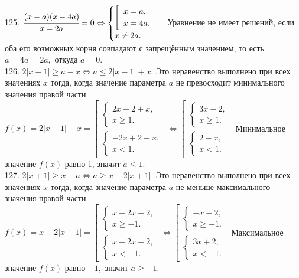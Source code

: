 \documentclass[12pt]{article}
\begin{document}
125. $\cfrac{(x-a)(x-4a)}{x-2a}=0\Leftrightarrow \begin{cases} \left[\begin{array}{l} x=a,\\ x=4a.\end{array}\right.\\ x\neq 2a.\end{cases}$ Уравнение не имеет решений, если оба его возможных корня совпадают с запрещённым значением, то есть $a=4a=2a,$ откуда $a=0.$\\
126. $2|x-1|\geqslant a-x\Leftrightarrow a\leqslant  2|x-1|+x.$ Это неравенство выполнено при всех значениях $x$ тогда, когда значение параметра $a$ не превосходит минимального значения правой части. $f(x)=2|x-1|+x=\left[\begin{array}{l}\begin{cases}2x-2+x,\\ x\geqslant 1. \end{cases}\\ \begin{cases}-2x+2+x,\\ x< 1. \end{cases}\end{array}\right.\Leftrightarrow\left[\begin{array}{l}\begin{cases}3x-2,\\ x\geqslant 1. \end{cases}\\ \begin{cases}2-x,\\ x<1. \end{cases}\end{array}\right.$ Минимальное значение $f(x)$ равно 1, значит $a\leqslant1.$\\
127. $2|x+1|\geqslant x-a\Leftrightarrow a\geqslant  x-2|x+1|.$ Это неравенство выполнено при всех значениях $x$ тогда, когда значение параметра $a$ не меньше максимального значения правой части. $f(x)=x-2|x+1|=\left[\begin{array}{l}\begin{cases}x-2x-2,\\ x\geqslant -1. \end{cases}\\ \begin{cases}x+2x+2,\\ x< -1. \end{cases}\end{array}\right.\Leftrightarrow\left[\begin{array}{l}\begin{cases}-x-2,\\ x\geqslant -1. \end{cases}\\ \begin{cases}3x+2,\\ x<-1. \end{cases}\end{array}\right.$ Максимальное значение $f(x)$ равно $-1,$ значит $a\geqslant-1.$\\
\end{document}
